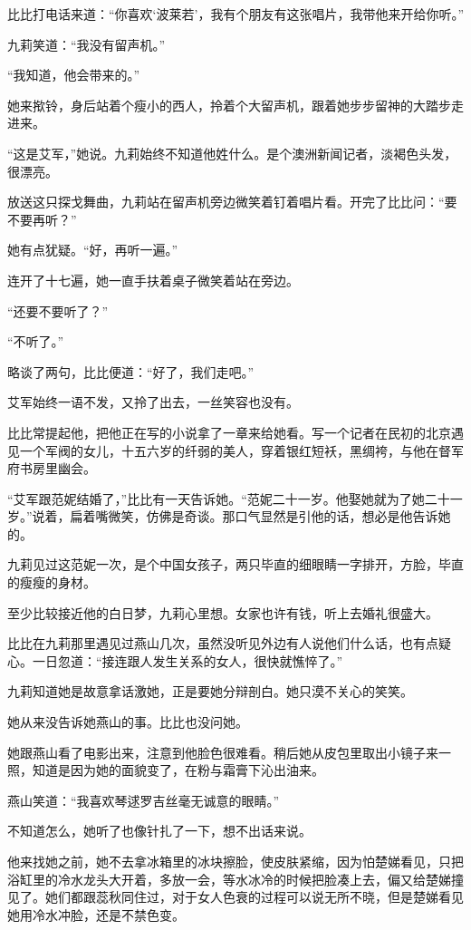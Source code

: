 \par 比比打电话来道：“你喜欢‘波莱若’，我有个朋友有这张唱片，我带他来开给你听。”
\par 九莉笑道：“我没有留声机。”
\par “我知道，他会带来的。”
\par 她来揿铃，身后站着个瘦小的西人，拎着个大留声机，跟着她步步留神的大踏步走进来。
\par “这是艾军，”她说。九莉始终不知道他姓什么。是个澳洲新闻记者，淡褐色头发，很漂亮。
\par 放送这只探戈舞曲，九莉站在留声机旁边微笑着钉着唱片看。开完了比比问：“要不要再听？”
\par 她有点犹疑。“好，再听一遍。”
\par 连开了十七遍，她一直手扶着桌子微笑着站在旁边。
\par “还要不要听了？”
\par “不听了。”
\par 略谈了两句，比比便道：“好了，我们走吧。”
\par 艾军始终一语不发，又拎了出去，一丝笑容也没有。
\par 比比常提起他，把他正在写的小说拿了一章来给她看。写一个记者在民初的北京遇见一个军阀的女儿，十五六岁的纤弱的美人，穿着银红短袄，黑绸袴，与他在督军府书房里幽会。
\par “艾军跟范妮结婚了，”比比有一天告诉她。“范妮二十一岁。他娶她就为了她二十一岁。”说着，扁着嘴微笑，仿佛是奇谈。那口气显然是引他的话，想必是他告诉她的。
\par 九莉见过这范妮一次，是个中国女孩子，两只毕直的细眼睛一字排开，方脸，毕直的瘦瘦的身材。
\par 至少比较接近他的白日梦，九莉心里想。女家也许有钱，听上去婚礼很盛大。
\par 比比在九莉那里遇见过燕山几次，虽然没听见外边有人说他们什么话，也有点疑心。一日忽道：“接连跟人发生关系的女人，很快就憔悴了。”
\par 九莉知道她是故意拿话激她，正是要她分辩剖白。她只漠不关心的笑笑。
\par 她从来没告诉她燕山的事。比比也没问她。
\par 她跟燕山看了电影出来，注意到他脸色很难看。稍后她从皮包里取出小镜子来一照，知道是因为她的面貌变了，在粉与霜膏下沁出油来。
\par 燕山笑道：“我喜欢琴逑罗吉丝毫无诚意的眼睛。”
\par 不知道怎么，她听了也像针扎了一下，想不出话来说。
\par 他来找她之前，她不去拿冰箱里的冰块擦脸，使皮肤紧缩，因为怕楚娣看见，只把浴缸里的冷水龙头大开着，多放一会，等水冰冷的时候把脸凑上去，偏又给楚娣撞见了。她们都跟蕊秋同住过，对于女人色衰的过程可以说无所不晓，但是楚娣看见她用冷水冲脸，还是不禁色变。
